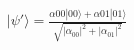 \documentclass[preview]{standalone}
\begin{document}
\begin{align*}
|\psi'\rangle = \frac{\alpha{00} |00\rangle + \alpha{01}|01\rangle}{\sqrt{|\alpha_{00}|^2 + |\alpha_{01}|^2}}
\end{align*}
\end{document}
